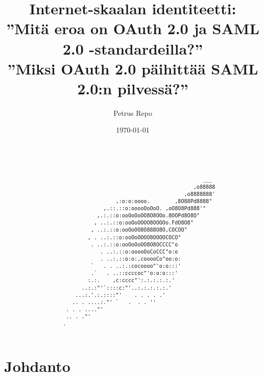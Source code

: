 \documentclass[english,gradu]{tktltiki}
\begin{document}
\title{Internet-skaalan identiteetti:
    \\ ''Mitä eroa on OAuth 2.0 ja SAML 2.0 -standardeilla?''
    \\ ''Miksi OAuth 2.0 päihittää SAML 2.0:n pilvessä?''}
\author{Petrus Repo}
\date{\today}
\maketitle


\onehalfspacing

\subject{Tietojenkäsittelytiede}


\begin{abstract}

  \begin{verbatim}




                                                            ___
                                                         ,o88888
                                                      ,o8888888'
                                ,:o:o:oooo.        ,8O88Pd8888"
                            ,.::.::o:ooooOoOoO. ,oO8O8Pd888'"
                          ,.:.::o:ooOoOoOO8O8OOo.8OOPd8O8O"
                         , ..:.::o:ooOoOOOO8OOOOo.FdO8O8"
                        , ..:.::o:ooOoOO8O888O8O,COCOO"
                       , . ..:.::o:ooOoOOOO8OOOOCOCO"
                        . ..:.::o:ooOoOoOO8O8OCCCC"o
                           . ..:.::o:ooooOoCoCCC"o:o
                           . ..:.::o:o:,cooooCo"oo:o:
                        `   . . ..:.:cocoooo"'o:o:::'
                        .`   . ..::ccccoc"'o:o:o:::'
                       :.:.    ,c:cccc"':.:.:.:.:.'
                     ..:.:"'`::::c:"'..:.:.:.:.:.'
                   ...:.'.:.::::"'    . . . . .'
                  .. . ....:."' `   .  . . ''
                . . . ...."'
                .. . ."'
               .

  \end{verbatim}

\end{abstract}

\setcounter{tocdepth}{3}
\mytableofcontents

\section{Johdanto} %
\label{sec:johdanto}
\end{document}
